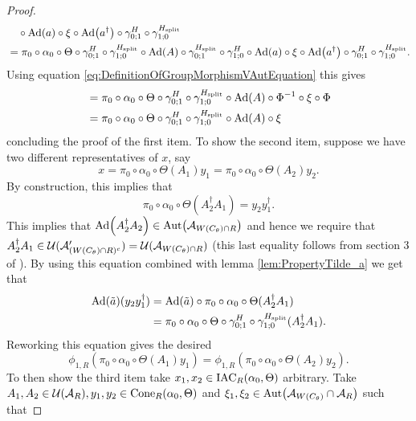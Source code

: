 \documentclass[12pt,a4paper,twoside]{article}
\numberwithin{equation}{section}
\begin{document}
\begin{proof}
\begin{align}
		\nonumber
		&\quad\circ\Ad{a}\circ\xi\circ\Ad{a^\dagger}\circ\gamma^H_{0;1}\circ\gamma^{H_\text{split}}_{1;0}\\
		&=\pi_0\circ\alpha_0\circ\Theta\circ\gamma^H_{0;1}\circ\gamma^{H_\text{split}}_{1;0}\circ\Ad{A}\circ\gamma^{H_\text{split}}_{0;1}\circ\gamma^H_{1;0}\circ\Ad{a}\circ\xi\circ\Ad{a^\dagger}\circ\gamma^H_{0;1}\circ\gamma^{H_\text{split}}_{1;0}.
	\end{align}
	Using equation \eqref{eq:DefinitionOfGroupMorphismVAutEquation} this gives
	\begin{align}
		&=\pi_0\circ\alpha_0\circ\Theta\circ\gamma^H_{0;1}\circ\gamma^{H_\text{split}}_{1;0}\circ\Ad{A}\circ\Phi^{-1}\circ\xi\circ\Phi\\
		&=\pi_0\circ\alpha_0\circ\Theta\circ\gamma^H_{0;1}\circ\gamma^{H_\text{split}}_{1;0}\circ\Ad{A}\circ\xi
	\end{align}
	concluding the proof of the first item. To show the second item, suppose we have two different representatives of $x$, say
\begin{equation}
	x=\pi_0\circ\alpha_0\circ\Theta(A_1)y_1=\pi_0\circ\alpha_0\circ\Theta(A_2)y_2.
\end{equation}
By construction, this implies that
\begin{equation}\label{eq:ProofThatphi1IsIndependentOfChoiceOfRepresentative}
	\pi_0\circ\alpha_0\circ\Theta(A_2^\dagger A_1)=y_2 y_1^\dagger.
\end{equation}
This implies that $\Ad{A_2^\dagger A_2}\in\Aut{\AA_{W(C_\theta)\cap R}}$ and hence we require that $A_2^\dagger A_1\in\mathcal U(\mathcal A_{(W(C_\theta)\cap R)^c}')=\mathcal U(\mathcal A_{W(C_\theta)\cap R})$ (this last equality follows from section 3 of \cite{NaScWe_2013}). By using this equation combined with lemma \ref{lem:PropertyTilde_a} we get that
\begin{align}
	\Ad{\tilde{a}}(y_2y_1^\dagger)&=\Ad{\tilde{a}}\circ\pi_0\circ\alpha_0\circ\Theta(A_2^\dagger A_1)\\
	&=\pi_0\circ\alpha_0\circ\Theta\circ\gamma^H_{0;1}\circ\gamma^{H_\text{split}}_{1;0}(A_2^\dagger A_1).
\end{align}
Reworking this equation gives the desired
\begin{equation}
	\phi_{1,R}(\pi_0\circ\alpha_0\circ\Theta(A_1)y_1)=\phi_{1,R}(\pi_0\circ\alpha_0\circ\Theta(A_2)y_2).
\end{equation}
To then show the third item take $x_1,x_2\in \textrm{IAC}_R(\alpha_0,\Theta)$ arbitrary. Take $A_1,A_2\in\mathcal U(\mathcal A_R),y_1,y_2\in \textrm{Cone}_R(\alpha_0,\Theta)$ and $\xi_1,\xi_2\in\Aut{\AA_{W(C_\theta)}\cap\AA_R}$ such that

\end{proof}
\end{document}
